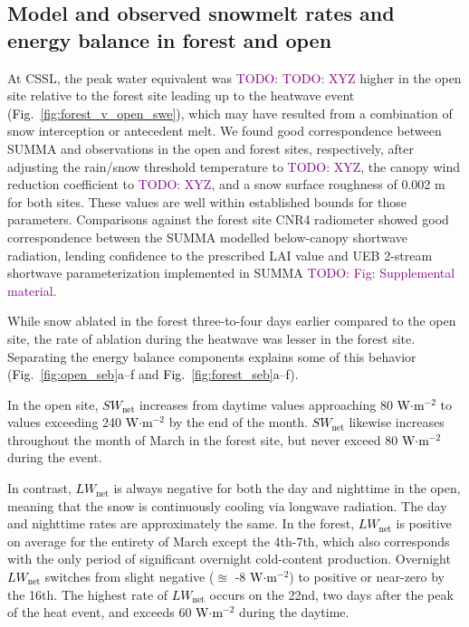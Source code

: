 \documentclass[12pt]{iopjournal}
\newcommand{\fig}[2]{\textcolor{black}{(Fig.~\ref{#1}{#2})}}   %
\newcommand{\fignop}[2]{\textcolor{black}{Fig.~\ref{#1}{#2}}}  %
\newcommand{\comment}[1]{\textcolor{purple}{TODO: #1}}      %
\newcommand{\lwnet}{\textcolor{black}{$LW_{\mathrm{net}}$}\xspace}
\newcommand{\swnet}{\textcolor{black}{$SW_{\mathrm{net}}$}\xspace}
\newcommand{\wmsq}{\textcolor{black}{W$\cdot$m$^{-2}$}\xspace}
\begin{document}


\subsection{Model and observed snowmelt rates and energy balance in forest and open}

At CSSL, the peak water equivalent was \comment{\comment{XYZ}} higher in the open site relative to the forest site leading up to the heatwave event \fig{fig:forest_v_open_swe}{}, which may have resulted from a combination of snow interception or antecedent melt.
We found good correspondence between SUMMA and observations in the open and forest sites, respectively, after adjusting the rain/snow threshold temperature to \comment{XYZ}, the canopy wind reduction coefficient to \comment{XYZ}, and a snow surface roughness of 0.002 m for both sites. 
These values are well within established bounds for those parameters.
Comparisons against the forest site CNR4 radiometer showed good correspondence between the SUMMA modelled below-canopy shortwave radiation, lending confidence to the prescribed LAI value and UEB 2-stream shortwave parameterization implemented in SUMMA \comment{Fig: Supplemental material}.

While snow ablated in the forest three-to-four days earlier compared to the open site, the rate of ablation during the heatwave was lesser in the forest site.
Separating the energy balance components explains some of this behavior (\fignop{fig:open_seb}{a--f} and \fignop{fig:forest_seb}{a--f}).

In the open site, \swnet increases from daytime values approaching 80 \wmsq to values exceeding 240 \wmsq by the end of the month. 
\swnet likewise increases throughout the month of March in the forest site, but never exceed 80 \wmsq during the event. 

In contrast, \lwnet is always negative for both the day and nighttime in the open, meaning that the snow is continuously cooling via longwave radiation. 
The day and nighttime rates are approximately the same.
In the forest, \lwnet is positive on average for the entirety of March except the 4th-7th, which also corresponds with the only period of significant overnight cold-content production.
Overnight \lwnet switches from slight negative ($\approxeq$ -8 \wmsq) to positive or near-zero by the 16th.
The highest rate of \lwnet occurs on the 22nd, two days after the peak of the heat event, and exceeds 60 \wmsq during the daytime. 
\end{document}
